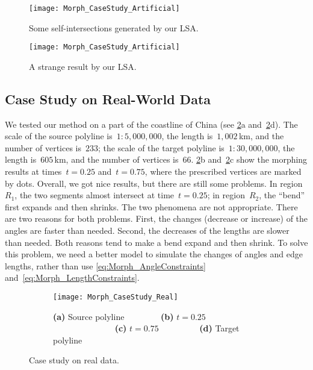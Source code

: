 \begin{figure}[tb]
	\centering	
	\texttt{[image: Morph\_CaseStudy\_Artificial]}
	\caption{Some self-intersections generated by our LSA.}
	\label{fig:Morph_DataComplex}
\par\vspace{\intextsep} %
	\centering	
	\texttt{[image: Morph\_CaseStudy\_Artificial]}
	\caption{A strange result by our LSA.}
	\label{fig:Morph_ExtraVertices}
\end{figure}

\subsection{Case Study on Real-World Data}
\label{sec:Morph_CaseStudy}

We tested our method on a part of the coastline of China 
(see \figs\ref{fig:Morph_RealData}a 
and~\ref{fig:Morph_RealData}d). 
The scale of the source polyline is~$1:5{,}000{,}000$,
the length is~$1{,}002\,$km, 
and the number of vertices is~$233$; 
the scale of the target polyline is~$1:30{,}000{,}000$, 
the length is~$605\,$km, 
and the number of vertices is~$66$. 
%
\figs\ref{fig:Morph_RealData}b and~\ref{fig:Morph_RealData}c
show the morphing results
at times~$t = 0.25$ and~$t = 0.75$,
where the prescribed vertices are marked by dots. 
Overall, we got nice results, 
but there are still some problems. 
In region~$R_{1}$, the two segments almost 
intersect at time~$t = 0.25$; 
in region~$R_{2}$, 
the ``bend'' first expands and then shrinks. 
The two phenomena are not appropriate. 
There are two reasons for both problems. 
First, the changes (decrease or increase) of the angles 
are faster than needed. 
Second, the decreases of the lengths are slower than needed. 
Both reasons tend to make a bend expand and then shrink. 
To solve this problem, we need a better model to 
simulate the changes of angles and edge lengths,
rather than use \eqs\ref{eq:Morph_AngleConstraints}
and~\ref{eq:Morph_LengthConstraints}.

\begin{figure}[tb]
\begin{subfigure}[b]{\textwidth}
	\centering
	\texttt{[image: Morph\_CaseStudy\_Real]}
	\caption{
		\textbf{(a)} Source polyline~~~~~~~~
		\textbf{(b)} $t=0.25$~~~~~~~~~~~~~~
		\textbf{(c)} $t=0.75$~~~~~~~~~
		\textbf{(d)} Target polyline}
\end{subfigure}
\caption{Case study on real data.}
\label{fig:Morph_RealData}
\end{figure}


